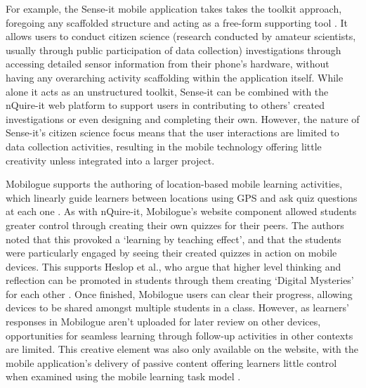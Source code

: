 For example, the Sense-it mobile application takes takes the toolkit approach, foregoing any scaffolded structure and acting as a free-form supporting tool \citep{Sharples2017}. It allows users to conduct citizen science (research conducted by amateur scientists, usually through public participation of data collection) investigations through accessing detailed sensor information from their phone’s hardware, without having any overarching activity scaffolding within the application itself. While alone it acts as an unstructured toolkit, Sense-it can be combined with the nQuire-it web platform to support users in contributing to others’ created investigations or even designing and completing their own. However, the nature of Sense-it’s citizen science focus means that the user interactions are limited to data collection activities, resulting in the mobile technology offering little creativity unless integrated into a larger project.

Mobilogue supports the authoring of location-based mobile learning activities, which linearly guide learners between locations using GPS and ask quiz questions at each one \citep{Giemza2013}. As with nQuire-it, Mobilogue’s website component allowed students greater control through creating their own quizzes for their peers. The authors noted that this provoked a `learning by teaching effect’, and that the students were particularly engaged by seeing their created quizzes in action on mobile devices. This supports Heslop et al., who argue that higher level thinking and reflection can be promoted in students through them creating ‘Digital Mysteries’ for each other \citep{Heslop2017}. Once finished, Mobilogue users can clear their progress, allowing devices to be shared amongst multiple students in a class. However, as learners’ responses in Mobilogue aren't uploaded for later review on other devices, opportunities for seamless learning through follow-up activities in other contexts are limited. This creative element was also only available on the website, with the mobile application’s delivery of passive content offering learners little control when examined using the mobile learning task model \citep{Taylor2006}.

